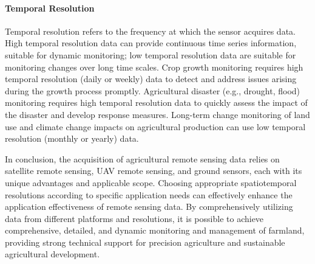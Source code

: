 \paragraph{Temporal Resolution}

Temporal resolution refers to the frequency at which the sensor acquires data. High temporal resolution data can provide continuous time series information, suitable for dynamic monitoring; low temporal resolution data are suitable for monitoring changes over long time scales.
Crop growth monitoring requires high temporal resolution (daily or weekly) data to detect and address issues arising during the growth process promptly.
Agricultural disaster (e.g., drought, flood) monitoring requires high temporal resolution data to quickly assess the impact of the disaster and develop response measures.
Long-term change monitoring of land use and climate change impacts on agricultural production can use low temporal resolution (monthly or yearly) data.

In conclusion, the acquisition of agricultural remote sensing data relies on satellite remote sensing, UAV remote sensing, and ground sensors, each with its unique advantages and applicable scope. Choosing appropriate spatiotemporal resolutions according to specific application needs can effectively enhance the application effectiveness of remote sensing data. By comprehensively utilizing data from different platforms and resolutions, it is possible to achieve comprehensive, detailed, and dynamic monitoring and management of farmland, providing strong technical support for precision agriculture and sustainable agricultural development.